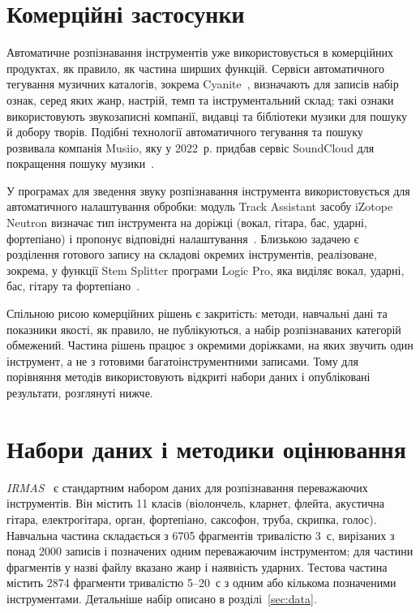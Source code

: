 \section{Комерційні застосунки}
\label{sec:commercial}

Автоматичне розпізнавання інструментів уже використовується в
комерційних продуктах, як правило, як частина ширших функцій. Сервіси
автоматичного тегування музичних каталогів, зокрема Cyanite~\cite{cyanite},
визначають для записів набір ознак, серед яких жанр, настрій, темп та
інструментальний склад; такі ознаки використовують звукозаписні компанії,
видавці та бібліотеки музики для пошуку й добору творів. Подібні
технології автоматичного тегування та пошуку розвивала компанія Musiio,
яку у 2022~р. придбав сервіс SoundCloud для покращення пошуку
музики~\cite{musiio2022}.

У програмах для зведення звуку розпізнавання інструмента використовується
для автоматичного налаштування обробки: модуль Track Assistant засобу
iZotope Neutron визначає тип інструмента на доріжці (вокал, гітара, бас,
ударні, фортепіано) і пропонує відповідні налаштування~\cite{izotope}.
Близькою задачею є розділення готового запису на складові окремих
інструментів, реалізоване, зокрема, у функції Stem Splitter програми
Logic Pro, яка виділяє вокал, ударні, бас, гітару та
фортепіано~\cite{logicpro2025}.

Спільною рисою комерційних рішень є закритість: методи, навчальні дані
та показники якості, як правило, не публікуються, а набір розпізнаваних
категорій обмежений. Частина рішень працює з окремими доріжками, на яких
звучить один інструмент, а не з готовими багатоінструментними записами.
Тому для порівняння методів використовують відкриті набори даних і
опубліковані результати, розглянуті нижче.

\section{Набори даних і методики оцінювання}
\label{sec:datasets}

\textit{IRMAS}~\cite{irmas2012} є стандартним набором даних для
розпізнавання переважаючих інструментів. Він містить 11 класів
(віолончель, кларнет, флейта, акустична гітара, електрогітара, орган,
фортепіано, саксофон, труба, скрипка, голос). Навчальна частина складається
з 6705 фрагментів тривалістю 3~с, вирізаних з понад 2000 записів і
позначених одним переважаючим інструментом; для частини фрагментів у назві
файлу вказано жанр і наявність ударних. Тестова частина містить 2874
фрагменти тривалістю 5--20~с з одним або кількома позначеними
інструментами. Детальніше набір описано в розділі~\ref{sec:data}.

